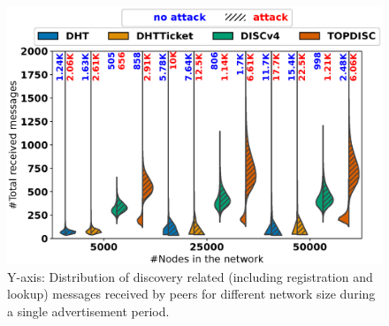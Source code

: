 %

\begin{figure}[!h]
\centering
\includegraphics[width=\linewidth]{results/split/size_totalMsg.eps}
\caption{Y-axis: Distribution of discovery related (including registration and lookup) messages received by peers for different network size during a single advertisement period.}
\label{fig:msgsPerSize}
\end{figure}

